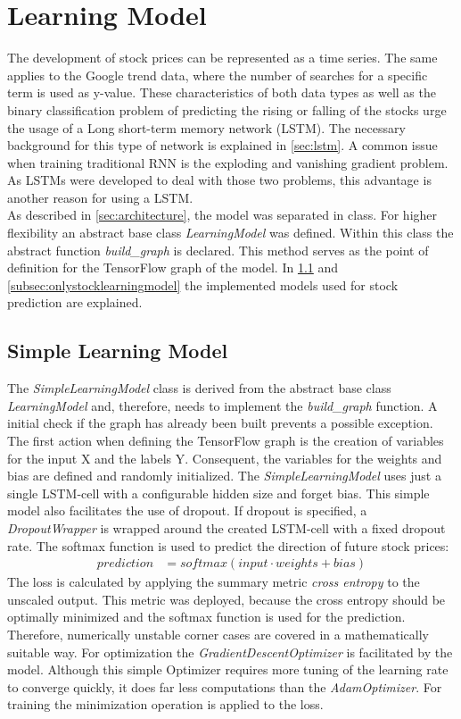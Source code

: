 \section{Learning Model}
\label{sec:model}
The development of stock prices can be represented as a time series. The same applies to the Google trend data, where the number of searches for a specific term is used as y-value. These characteristics of both data types as well as the binary classification problem of predicting the rising or falling of the stocks urge the usage of a Long short-term memory network (LSTM). The necessary background for this type of network is explained in \ref{sec:lstm}. A common issue when training traditional RNN is the exploding and vanishing gradient problem. As LSTMs were developed to deal with those two problems, this advantage is another reason for using a LSTM. 
\\
As described in \ref{sec:architecture}, the model was separated in class. For higher flexibility an abstract base class \textit{LearningModel} was defined. Within this class the abstract function \textit{build\_graph} is declared. This method serves as the point of definition for the TensorFlow graph of the model. In \ref{subsec:simplelearningmodel} and \ref{subsec:onlystocklearningmodel} the implemented models used for stock prediction are explained. 

\subsection{Simple Learning Model}
\label{subsec:simplelearningmodel}
The \textit{SimpleLearningModel} class is derived from the abstract base class \textit{LearningModel} and, therefore, needs to implement the \textit{build\_graph} function. A initial check if the graph has already been built prevents a possible exception. The first action when defining the TensorFlow graph is the creation of variables for the input X and the labels Y. Consequent, the variables for the weights and bias are defined and randomly initialized. The \textit{SimpleLearningModel} uses just a single LSTM-cell with a configurable hidden size and forget bias. This simple model also facilitates the use of dropout. If dropout is specified, a \textit{DropoutWrapper} is wrapped around the created LSTM-cell with a fixed dropout rate. The softmax function is used to predict the direction of future stock prices:
\begin{align}
prediction &= softmax(input \cdot weights + bias)
\end{align}
The loss is calculated by applying the summary metric \textit{cross entropy} to the unscaled output. This metric was deployed, because the cross entropy should be optimally minimized and the softmax function is used for the prediction. Therefore, numerically unstable corner cases are covered in a mathematically suitable way. For optimization the \textit{GradientDescentOptimizer} is facilitated by the model. Although this simple Optimizer requires more tuning of the learning rate to converge quickly, it does far less computations than the \textit{AdamOptimizer}. For training the minimization operation is applied to the loss. 

